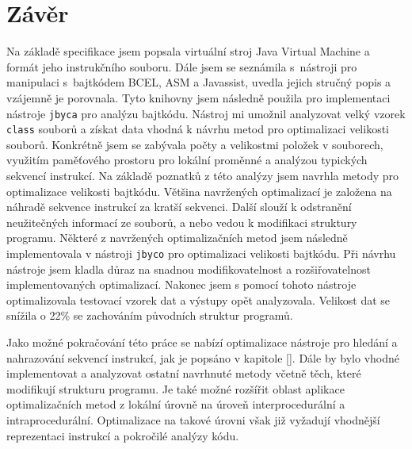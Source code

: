 \chapter{Závěr}\label{Conclusion}


Na základě specifikace \cite{Lindholm:JVM} jsem popsala virtuální stroj Java Virtual Machine a formát jeho instrukčního souboru.  Dále jsem se seznámila s~nástroji pro manipulaci s~bajtkódem BCEL, ASM a Javassist, uvedla jejich stručný popis a vzájemně je porovnala. Tyto knihovny jsem následně použila pro implementaci nástroje \texttt{jbyca} pro analýzu bajtkódu. Nástroj mi umožnil analyzovat velký vzorek \texttt{class} souborů a získat data vhodná k návrhu metod pro optimalizaci velikosti souborů. Konkrétně jsem se zabývala počty a velikostmi položek v souborech, využitím paměťového prostoru pro lokální proměnné a analýzou typických sekvencí instrukcí. Na základě poznatků z této analýzy jsem navrhla metody pro optimalizace velikosti bajtkódu. Většina navržených optimalizací je založena na náhradě sekvence instrukcí za kratší sekvenci. Další slouží k odstranění neužitečných informací ze souborů, a nebo vedou k modifikaci struktury programu. Některé z navržených optimalizačních metod jsem následně implementovala v nástroji \texttt{jbyco} pro optimalizaci velikosti bajtkódu. Při návrhu nástroje jsem kladla důraz na snadnou modifikovatelnost a rozšiřovatelnost implementovaných optimalizací. Nakonec jsem s pomocí tohoto nástroje optimalizovala testovací vzorek dat a výstupy opět analyzovala. Velikost dat se snížila o 22\% se zachováním původních struktur programů.

Jako možné pokračování této práce se nabízí optimalizace nástroje pro hledání a nahrazování sekvencí instrukcí, jak je popsáno v kapitole \ref{}.
Dále by bylo vhodné implementovat a analyzovat ostatní navrhnuté metody včetně těch, které modifikují strukturu programu. Je také možné rozšířit oblast aplikace optimalizačních metod z lokální úrovně na úroveň interprocedurální a intraprocedurální. Optimalizace na takové úrovni však již vyžadují vhodnější reprezentaci instrukcí a pokročilé analýzy kódu.


